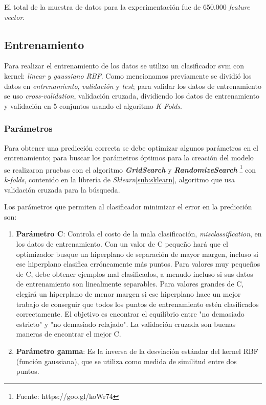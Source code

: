El total de la muestra de datos para la experimentación fue de 650.000 \textit{feature vector}.



\subsection{Entrenamiento}\label{sub:entrenamiento}

Para realizar el entrenamiento de los datos se utilizo un clasificador \ac{svm} con kernel: \textit{linear y gaussiano \"RBF\"}. Como mencionamos previamente se dividió los datos en \textit{entrenamiento}, \textit{validación} y \textit{test}; para validar los datos de entrenamiento se uso \textit{cross-validation}, validación cruzada, dividiendo los datos de entrenamiento y validación en 5 conjuntos usando el algoritmo \textit{K-Folds}. 


\subsubsection{Parámetros}\label{sub:parametros}


Para obtener una predicción  correcta se debe optimizar algunos parámetros en el entrenamiento; para buscar los parámetros óptimos para la creación del modelo se realizaron pruebas con el algoritmo  \textit{\textbf{GridSearch}} y \textit{\textbf{RandomizeSearch}} \footnote{Fuente: https://goo.gl/koWr74} con \textit{k-folds}, contenido en la librería de \textit{Sklearn}\ref{sub:sklearn}, algoritmo que usa validación cruzada para la búsqueda. 


Los parámetros que permiten al clasificador minimizar el error en la predicción  son:
\begin{enumerate}
	\item \textbf{Parámetro C}: Controla el costo de la mala clasificación, \textit{misclassification}, en los datos de entrenamiento. Con un valor de C pequeño hará que el optimizador busque un hiperplano de separación de mayor margen, incluso si ese hiperplano clasifica erróneamente más puntos. Para valores muy pequeños de C, debe obtener ejemplos mal clasificados, a menudo incluso si sus datos de entrenamiento son linealmente separables. Para valores grandes de C,  elegirá un hiperplano de menor margen si ese hiperplano hace un mejor trabajo de conseguir que todos los puntos de entrenamiento estén clasificados correctamente. El objetivo es encontrar el equilibrio entre "no demasiado estricto" y "no demasiado relajado". La validación cruzada  son buenas maneras de encontrar el mejor C.

	\item \textbf{Parámetro gamma}: Es la inversa de la desviación estándar del kernel RBF (función gaussiana), que se utiliza como medida de similitud entre dos puntos. 
\end{enumerate}

